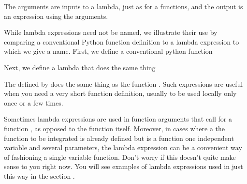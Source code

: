 \documentclass[letterpaper,10pt,english]{sphinxmanual}
\begin{document}
\begin{sphinxVerbatim}[commandchars=\\\{\}]
\end{sphinxVerbatim}

\sphinxAtStartPar
The arguments  are inputs to a lambda, just as for a functions, and the output is an expression using the arguments.

\sphinxAtStartPar
While lambda expressions need not be named, we illustrate their use by comparing a conventional Python function definition to a lambda expression to which we give a name.  First, we define a conventional python function

\begin{sphinxVerbatim}[commandchars=\\\{\},numbers=left,firstnumber=1,stepnumber=1]
  
      

\end{sphinxVerbatim}

\sphinxAtStartPar
Next, we define a lambda that does the same thing

\begin{sphinxVerbatim}[commandchars=\\\{\}]
      

\end{sphinxVerbatim}

\sphinxAtStartPar
The  defined by  does the same thing as the function .  Such  expressions are useful when you need a very short function definition, usually to be used locally only once or a few times.

\sphinxAtStartPar
Sometimes lambda expressions are used in function arguments that call for a function , as opposed to the function itself.  Moreover, in cases where a the function to be integrated is already defined but is a function one independent variable and several parameters, the lambda expression can be a convenient way of fashioning a single variable function.  Don’t worry if this doesn’t quite make sense to you right now.  You will see examples of lambda expressions used in just this way in the section {\hyperref[\detokenize{chap9/chap9_scipy:numericalintegration}]{}}.
\end{document}
